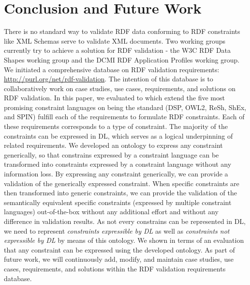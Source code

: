 \documentclass{llncs}
\begin{document}
\section{Conclusion and Future Work}
There is no standard way to validate RDF data conforming to RDF constraints like XML Schemas serve to validate XML documents.
Two working groups currently try to achieve a solution for RDF validation - the W3C RDF Data Shapes working group and the DCMI RDF Application Profiles working group. 
We initiated a comprehensive database on RDF validation requirements: \url{http://purl.org/net/rdf-validation}.
The intention of this database is to collaboratively work on case studies, use cases, requirements, and solutions on RDF validation.
In this paper, we evaluated to which extend the five most promising constraint languages on being the standard (DSP, OWL2, ReSh, ShEx, and SPIN) fulfill each of the requirements to formulate RDF constraints.
Each of these requirements corresponds to a type of constraint.
The majority of the constraints can be expressed in DL, which serves as a logical underpinning of related requirements.
We developed an ontology to express any constraint generically, so that constrains expressed by a constraint language  can be transformed into constraints expressed by a constraint language  without any information loss.
By expressing any constraint generically, we can provide a validation of the generically expressed constraint.
When specific constraints are then transformed into generic constraints, we can provide the validation of the semantically equivalent specific constraints (expressed by multiple constraint languages) out-of-the-box without any additional effort and without any difference in validation results. 
As not every constrains can be represented in DL, we need to represent \emph{constraints expressible by DL} as well as \emph{constraints not expressible by DL} by means of this ontology.
We shown in terms of an evaluation that any constraint can be expressed using the developed ontology.
As part of future work, we will continuously add, modify, and maintain case studies, use cases, requirements, and solutions within the RDF validation requirements database.



{}

\setcounter{tocdepth}{1}
\end{document}
